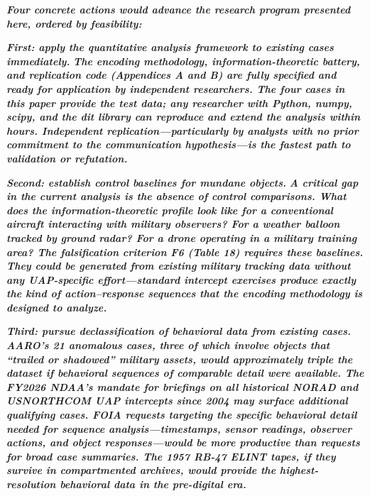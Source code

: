 \documentclass[11pt,letterpaper]{article}
\begin{document}
\textbf{\textit{Four concrete actions would advance the research program presented here, ordered by feasibility:}}


\textbf{\textit{First: apply the quantitative analysis framework to existing cases immediately.}}\textbf{\textit{ The encoding methodology, information-theoretic battery, and replication code (Appendices A and B) are fully specified and ready for application by independent researchers. The four cases in this paper provide the test data; any researcher with Python, numpy, scipy, and the dit library can reproduce and extend the analysis within hours. Independent replication---particularly by analysts with no prior commitment to the communication hypothesis---is the fastest path to validation or refutation.}}


\textbf{\textit{Second: establish control baselines for mundane objects.}}\textbf{\textit{ A critical gap in the current analysis is the absence of control comparisons. What does the information-theoretic profile look like for a conventional aircraft interacting with military observers? For a weather balloon tracked by ground radar? For a drone operating in a military training area? The falsification criterion F6 (Table 18) requires these baselines. They could be generated from existing military tracking data without any UAP-specific effort---standard intercept exercises produce exactly the kind of action--response sequences that the encoding methodology is designed to analyze.}}


\textbf{\textit{Third: pursue declassification of behavioral data from existing cases.}}\textbf{\textit{ AARO's 21 anomalous cases, three of which involve objects that ``trailed or shadowed'' military assets, would approximately triple the dataset if behavioral sequences of comparable detail were available. The FY2026 NDAA's mandate for briefings on all historical NORAD and USNORTHCOM UAP intercepts since 2004 may surface additional qualifying cases. FOIA requests targeting the specific behavioral detail needed for sequence analysis---timestamps, sensor readings, observer actions, and object responses---would be more productive than requests for broad case summaries. The 1957 RB-47 ELINT tapes, if they survive in compartmented archives, would provide the highest-resolution behavioral data in the pre-digital era.}}
\end{document}
